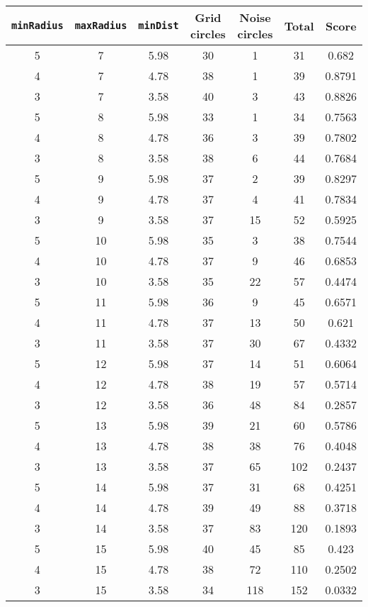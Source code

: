 \documentclass[letterpaper, 12pt]{article}
\begin{document}
\begin{longtable}{|c|c|c|c|c|c|c|}
\hline
\textbf{\texttt{minRadius}} & \textbf{\texttt{maxRadius}} & \textbf{\texttt{minDist}} & \textbf{Grid circles} & \textbf{Noise circles} & \textbf{Total} & \textbf{Score} \\
\hline
5 & 7 & 5.98 & 30 & 1 & 31 & 0.682 \\
\hline
4 & 7 & 4.78 & 38 & 1 & 39 & 0.8791 \\
\hline
3 & 7 & 3.58 & 40 & 3 & 43 & 0.8826 \\
\hline
5 & 8 & 5.98 & 33 & 1 & 34 & 0.7563 \\
\hline
4 & 8 & 4.78 & 36 & 3 & 39 & 0.7802 \\
\hline
3 & 8 & 3.58 & 38 & 6 & 44 & 0.7684 \\
\hline
5 & 9 & 5.98 & 37 & 2 & 39 & 0.8297 \\
\hline
4 & 9 & 4.78 & 37 & 4 & 41 & 0.7834 \\
\hline
3 & 9 & 3.58 & 37 & 15 & 52 & 0.5925 \\
\hline
5 & 10 & 5.98 & 35 & 3 & 38 & 0.7544 \\
\hline
4 & 10 & 4.78 & 37 & 9 & 46 & 0.6853 \\
\hline
3 & 10 & 3.58 & 35 & 22 & 57 & 0.4474 \\
\hline
5 & 11 & 5.98 & 36 & 9 & 45 & 0.6571 \\
\hline
4 & 11 & 4.78 & 37 & 13 & 50 & 0.621 \\
\hline
3 & 11 & 3.58 & 37 & 30 & 67 & 0.4332 \\
\hline
5 & 12 & 5.98 & 37 & 14 & 51 & 0.6064 \\
\hline
4 & 12 & 4.78 & 38 & 19 & 57 & 0.5714 \\
\hline
3 & 12 & 3.58 & 36 & 48 & 84 & 0.2857 \\
\hline
5 & 13 & 5.98 & 39 & 21 & 60 & 0.5786 \\
\hline
4 & 13 & 4.78 & 38 & 38 & 76 & 0.4048 \\
\hline
3 & 13 & 3.58 & 37 & 65 & 102 & 0.2437 \\
\hline
5 & 14 & 5.98 & 37 & 31 & 68 & 0.4251 \\
\hline
4 & 14 & 4.78 & 39 & 49 & 88 & 0.3718 \\
\hline
3 & 14 & 3.58 & 37 & 83 & 120 & 0.1893 \\
\hline
5 & 15 & 5.98 & 40 & 45 & 85 & 0.423 \\
\hline
4 & 15 & 4.78 & 38 & 72 & 110 & 0.2502 \\
\hline
3 & 15 & 3.58 & 34 & 118 & 152 & 0.0332 \\

\end{longtable}
\end{document}

